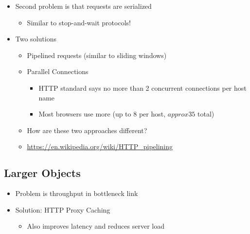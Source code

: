 \begin{itemize}[nosep]
    \item Second problem is that requests are serialized
          \begin{itemize}[nosep]
              \item Similar to stop-and-wait protocols!
          \end{itemize}
    \item Two solutions
          \begin{itemize}[nosep]
              \item Pipelined requests (similar to sliding windows)
              \item Parallel Connections
                    \begin{itemize}[nosep]
                        \item HTTP standard says no more than 2 concurrent connections per host name
                        \item Most browsers use more (up to 8 per host, $approx35$ total)
                    \end{itemize}
              \item How are these two approaches different?
              \item \url{https://en.wikipedia.org/wiki/HTTP_pipelining}
          \end{itemize}
\end{itemize}
\subsection{Larger Objects}
\begin{itemize}[nosep]
    \item Problem is throughput in bottleneck link
    \item Solution: HTTP Proxy Caching
          \begin{itemize}[nosep]
              \item Also improves latency and reduces server load
          \end{itemize}
\end{itemize}
\begin{figure}[H]
\end{figure}